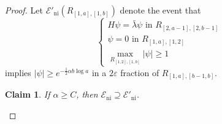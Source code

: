 \documentclass{amsart}
\newtheorem{claim}[equation]{Claim}
\numberwithin{equation}{section}
\numberwithin{figure}{section}
\newcommand{\ep}{\varepsilon}
\begin{document}
\begin{proof}
Let $\mathcal E'_{\mathrm{ni}}(R_{[1,a],[1,b]})$ denote the event that
\begin{equation*}
\begin{cases}
H \psi = \bar \lambda \psi \mbox{ in } R_{[2,a-1],[2,b-1]} \\
\psi = 0 \mbox{ in } R_{[1,a],[1,2]} \\
\max_{R_{[1,2],[1,b]}} |\psi| \geq 1
\end{cases}
\end{equation*}
implies $|\psi| \geq e^{-\frac12 \alpha b \log a}$ in a $2\ep$ fraction of $R_{[1,a],[b-1,b]}$.

\begin{claim}
If $\alpha \geq C$, then $\mathcal E_{\mathrm{ni}} \supseteq \mathcal E'_{\mathrm{ni}}$.
\end{claim}


\end{proof}
\end{document}

